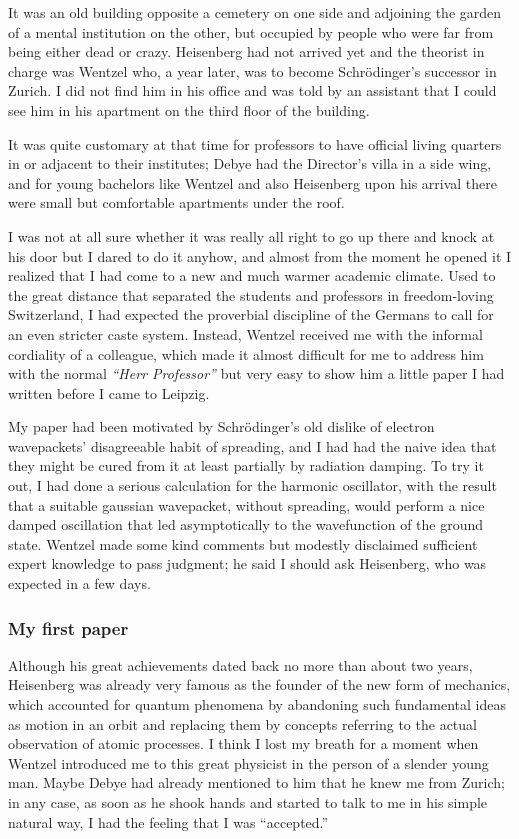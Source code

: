 \documentclass[12pt]{article}
\begin{document}
It was an old building opposite a cemetery on one side and adjoining the garden of a mental institution on the other, but occupied by people who were far from being either dead or crazy. Heisenberg had not arrived yet and the theorist in charge was Wentzel who, a year later, was to become Schr\"odinger's successor in Zurich. I did not find him in his office and was told by an assistant that I could see him in his apartment on the third floor of the building.

It was quite customary at that time for professors to have official living quarters in or adjacent to their institutes; Debye had the Director's villa in a side wing, and for young bachelors like Wentzel and also Heisenberg upon his arrival there were small but comfortable apartments under the roof.

I was not at all sure whether it was really all right to go up there and knock at his door but I dared to do it anyhow, and almost from the moment he opened it I realized that I had come to a new and much warmer academic climate. Used to the great distance that separated the students and professors in freedom-loving Switzerland, I had expected the proverbial discipline of the Germans to call for an even stricter caste system. Instead, Wentzel received me with the informal cordiality of a colleague, which made it almost difficult for me to address him
with the normal {\it ``Herr Professor''} but very easy to show him a little paper I had written before I came to Leipzig.

My paper had been motivated by Schr\"odinger's old dislike of electron wavepackets' disagreeable habit of spreading, and I had had the naive idea that they might be cured from it at least partially by radiation damping. To try it out, I had done a serious calculation for the harmonic oscillator, with the result that a suitable gaussian wavepacket,
without spreading, would perform a nice damped oscillation that led asymptotically to the wavefunction of the ground state. Wentzel made some kind comments but modestly disclaimed sufficient expert knowledge to pass judgment; he said I should ask Heisenberg, who was expected in a few days.

\subsubsection*{My first paper}

Although his great achievements dated back no more than about two years, Heisenberg was already very famous as the founder of the new form of mechanics, which accounted for quantum phenomena by abandoning such fundamental ideas as motion in an orbit and replacing them by concepts referring to the actual observation of atomic processes. I think I lost my breath for a moment when Wentzel introduced me to this great physicist in the person of a slender young man. Maybe Debye had already mentioned to him that he knew me from Zurich; in any case, as soon as he shook hands and started to talk to me in his simple natural way, I had the feeling that I was ``accepted.''
\end{document}
